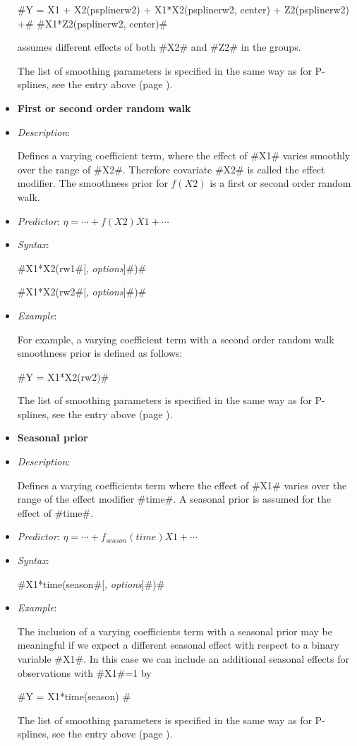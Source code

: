 \begin{itemize}
 #Y = X1 + X2(psplinerw2) + X1*X2(psplinerw2, center) + Z2(psplinerw2) +#
 #X1*Z2(psplinerw2, center)#

assumes different effects of both #X2# and #Z2# in the groups.

The list of smoothing parameters is specified in the same way as for P-splines,
see the entry above (page \pageref{psplines_stepwise}).

\item[]{\bf\sffamily First or second order random walk}

\item[] {\em Description}:

Defines a varying coefficient term, where the effect of #X1#
varies smoothly over the range of #X2#. Therefore covariate #X2#
is called the effect modifier. The smoothness prior for $f(X2)$ is
a first or second order random walk.
\item[] {\em Predictor}:
$\eta= \cdots + f(X2)X1 + \cdots$ \item[] {\em Syntax}:

#X1*X2(rw1#[, {\em options}]#)#

#X1*X2(rw2#[, {\em options}]#)#
\item[] {\em Example}:

For example, a varying coefficient term with a second order random
walk smoothness prior is defined as follows:

#Y = X1*X2(rw2)#

The list of smoothing parameters is specified in the same way as for P-splines,
see the entry above (page \pageref{psplines_stepwise}).

\item[]{\bf\sffamily Seasonal prior}

\item[] {\em Description}:

Defines a varying coefficients term where the effect of #X1#
varies over the range of the effect modifier #time#. A seasonal
prior is assumed for the effect of #time#.

\item[] {\em Predictor}: $\eta= \cdots + f_{season}(time)X1 +
\cdots $ \item[] {\em Syntax}:

#X1*time(season#[, {\em options}]#)#
\item[] {\em Example}:

The inclusion of a varying coefficients term with a seasonal prior
may be meaningful if we expect a different seasonal effect with
respect to a binary variable #X1#. In this case we can include an
additional seasonal effects for observations with #X1#=1 by

#Y = X1*time(season) #

The list of smoothing parameters is specified in the same way as for P-splines,
see the entry above (page \pageref{psplines_stepwise}).
\end{itemize}

